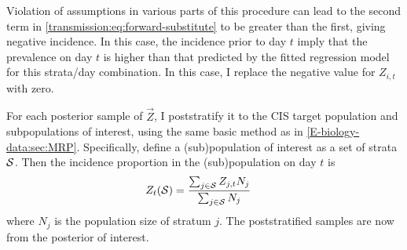\documentclass[thesis.tex]{subfiles}
\begin{document}

Violation of assumptions in various parts of this procedure can lead to the second term in \cref{transmission:eq:forward-substitute} to be greater than the first, giving negative incidence.
In this case, the incidence prior to day $t$ imply that the prevalence on day $t$ is higher than that predicted by the fitted regression model for this strata/day combination.
In this case, I replace the negative value for $Z_{i,t}$ with zero.

For each posterior sample of $\vec{Z}$, I poststratify it to the CIS target population and subpopulations of interest, using the same basic method as in \cref{E-biology-data:sec:MRP}.
Specifically, define a (sub)population of interest as a set of strata $\mathcal{S}$.
Then the incidence proportion in the (sub)population on day $t$ is
\begin{align}
Z_t(\mathcal{S})
&= \frac{\sum_{j \in \mathcal{S}} Z_{j,t} N_j}{\sum_{j \in \mathcal{S}} N_j}
\label{backcalc:eq:poststratify}
\end{align}
where $N_j$ is the population size of stratum $j$.
The poststratified samples are now from the posterior of interest.
\end{document}

